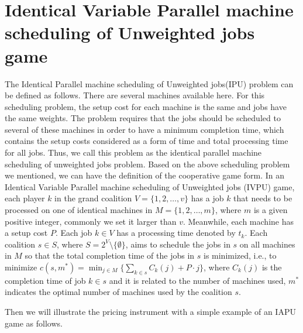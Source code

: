 \section*{Identical Variable Parallel machine scheduling of Unweighted jobs game}

The Identical Parallel machine scheduling of Unweighted jobs(IPU) problem can be defined as follows. There are several machines available here. For this scheduling problem, the setup cost for each machine is the same and jobs have the same weights. The problem requires that the jobs should be scheduled to several of these machines in order to have a minimum completion time, which contains the setup costs considered as a form of time and total processing time for all jobs. Thus, we call this problem as the
identical parallel machine scheduling of unweighted jobs problem.
Based on the above scheduling problem we mentioned, we can have the definition of the cooperative game form.
In an Identical Variable Parallel machine scheduling of Unweighted jobs (IVPU) game, each player $k$ in the grand coalition $V=\{1,2,\ldots,v\}$ has a job $k$ that needs to be processed on one of identical machines in $M=\{1,2,\ldots,m\}$, where $m$ is a given positive integer, commonly we set it larger than $v$. Meanwhile, each machine has a setup cost $P$. Each job $k\in V$ has a processing time denoted by $t_k$. Each coalition $s \in S$, where $S=2^V\setminus\{\emptyset\}$, aims to schedule the jobs in $s$ on all machines in $M$ so that the total completion time of the jobs in $s$ is minimized, i.e., to minimize
$c(s,m^*) = \min_{j \in M} \{\sum_{k\in s}{C_k(j)}+ P\cdot j\}$, where $C_k(j)$ is the completion time of job $k\in s$ and it is related to the number of machines used, $m^*$ indicates the optimal number of machines used by the coalition $s$.

Then we will illustrate the pricing instrument with a simple example of an IAPU game as follows.
